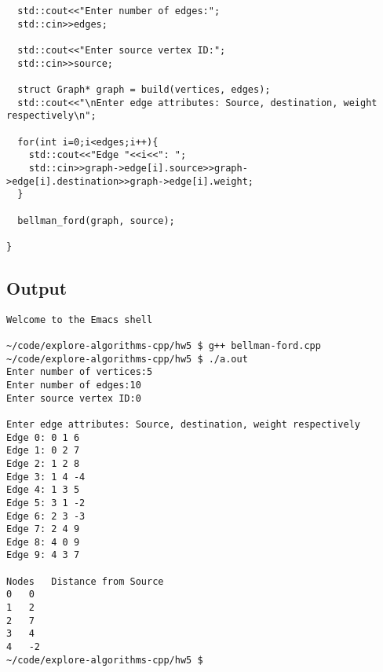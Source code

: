 \documentclass{article}
\begin{document}
\begin{verbatim}
  std::cout<<"Enter number of edges:";
  std::cin>>edges;

  std::cout<<"Enter source vertex ID:";
  std::cin>>source;
 
  struct Graph* graph = build(vertices, edges); 
  std::cout<<"\nEnter edge attributes: Source, destination, weight respectively\n";
  
  for(int i=0;i<edges;i++){
    std::cout<<"Edge "<<i<<": ";
    std::cin>>graph->edge[i].source>>graph->edge[i].destination>>graph->edge[i].weight;
  }
 
  bellman_ford(graph, source);
  
}
\end{verbatim}

\subsection{Output}

\begin{verbatim}
Welcome to the Emacs shell

~/code/explore-algorithms-cpp/hw5 $ g++ bellman-ford.cpp 
~/code/explore-algorithms-cpp/hw5 $ ./a.out 
Enter number of vertices:5
Enter number of edges:10
Enter source vertex ID:0

Enter edge attributes: Source, destination, weight respectively
Edge 0: 0 1 6
Edge 1: 0 2 7
Edge 2: 1 2 8
Edge 3: 1 4 -4
Edge 4: 1 3 5
Edge 5: 3 1 -2
Edge 6: 2 3 -3
Edge 7: 2 4 9
Edge 8: 4 0 9
Edge 9: 4 3 7

Nodes 	Distance from Source
0	0
1	2
2	7
3	4
4	-2
~/code/explore-algorithms-cpp/hw5 $   
\end{verbatim}  
\end{document}
